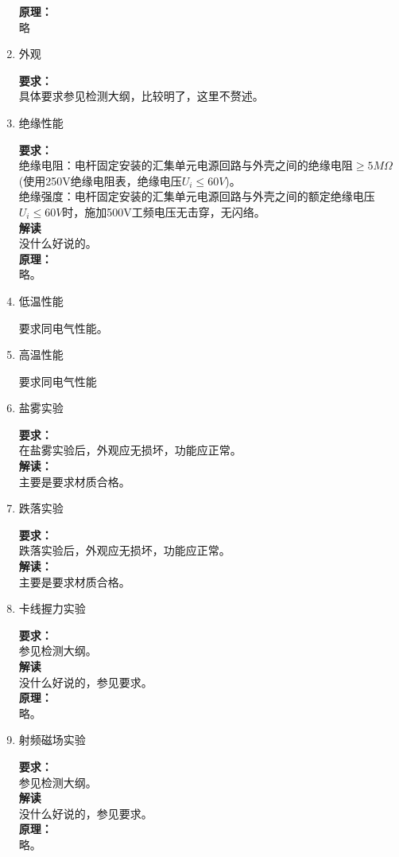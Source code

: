 \documentclass{article}
\begin{document}
\begin{CJK}{UTF8}{gbsn}
\begin{enumerate}
	\textbf{原理：}\\
	略
\item 外观 
	\par
	\textbf{要求：}\\
	具体要求参见检测大纲，比较明了，这里不赘述。

\item 绝缘性能
	\par
	\textbf{要求：}\\
	绝缘电阻：电杆固定安装的汇集单元电源回路与外壳之间的绝缘电阻$\geq 5M\Omega$(使用250V绝缘电阻表，绝缘电压$U_i\leq 60V$)。\\
	绝缘强度：电杆固定安装的汇集单元电源回路与外壳之间的额定绝缘电压$U_i \leq 60V$时，施加500V工频电压无击穿，无闪络。\\
	\textbf{解读}\\
	没什么好说的。\\
	\textbf{原理：}\\
	略。

\item 低温性能
	\par
	要求同电气性能。
\item 高温性能
	\par
	要求同电气性能
\item 盐雾实验
	\par
	\textbf{要求：}\\
	在盐雾实验后，外观应无损坏，功能应正常。\\
	\textbf{解读：}\\
	主要是要求材质合格。
\item 跌落实验
	\par
	\textbf{要求：}\\
	跌落实验后，外观应无损坏，功能应正常。\\
	\textbf{解读：}\\
	主要是要求材质合格。
\item 卡线握力实验
	\par
	\textbf{要求：}\\
	参见检测大纲。\\
	\textbf{解读}\\
	没什么好说的，参见要求。\\
	\textbf{原理：}\\
	略。

\item 射频磁场实验
	\par
	\textbf{要求：}\\
	参见检测大纲。\\
	\textbf{解读}\\
	没什么好说的，参见要求。\\
	\textbf{原理：}\\
	略。


\end{enumerate}
\end{CJK}
\end{document}
